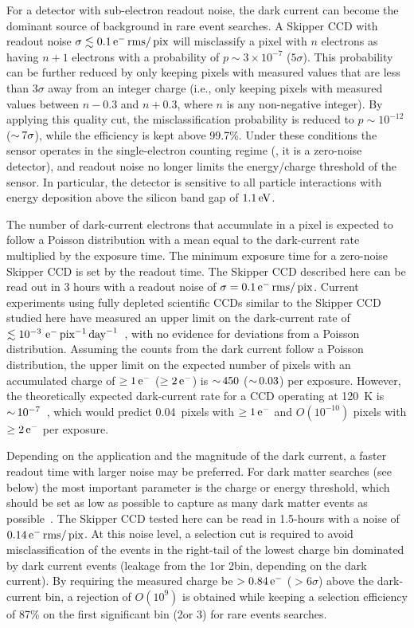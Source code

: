 \documentclass[aps,prl,reprint,superscriptaddress,floatfix,nofootinbib,showkeys,showpacs,preprintnumbers]{revtex4-1}
\begin{document}
For a detector with sub-electron readout noise, the dark current can become the dominant source of background in rare event searches.
A Skipper CCD with readout noise $\sigma \lesssim 0.1 \mathrm{\,e^{-}} \mathrm{\,rms}/\mathrm{\,pix}$ will misclassify a pixel with $n$ electrons as having $n+1$ electrons with a probability of $p\sim3\times10^{-7}$ ($5\sigma$).
This probability can be further reduced by only keeping pixels with measured values that are less than 3$\sigma$ away from an integer charge (i.e., only keeping pixels with measured values between $n-0.3$ and $n + 0.3$, where $n$ is any non-negative integer).
By applying this quality cut, the misclassification probability is reduced to $p\sim10^{-12}$ ($ {\sim}\, 7\sigma$), while the efficiency is kept above 99.7\%.
Under these conditions the sensor operates in the single-electron counting regime (\ie, it is a zero-noise detector), and readout noise no longer limits the energy/charge threshold of the sensor.
In particular, the detector is sensitive to all particle interactions with energy deposition above the silicon band gap of $1.1\mathrm{\,eV}$. 

The number of dark-current electrons that accumulate in a pixel is expected to follow a Poisson distribution with a mean equal to the dark-current rate multiplied by the exposure time.
The minimum exposure time for a zero-noise Skipper CCD is set by the readout time. 
The Skipper CCD described here can be read out in 3 hours with a readout noise of $\sigma = 0.1 \mathrm{\,e^{-}} \mathrm{\,rms}/\mathrm{\,pix}$.
Current experiments using fully depleted scientific CCDs similar to the Skipper CCD studied here have measured an upper limit on the dark-current rate of $\lesssim 10^{-3} \mathrm{\,\mathrm{\,e^{-}} \mathrm{\,pix}^{-1} \mathrm{\,day}^{-1}}$~\cite{Aguilar-Arevalo:2016zop}, with no evidence for deviations from a Poisson distribution.
Assuming the counts from the dark current follow a Poisson distribution, the upper limit on the expected number of pixels with an accumulated charge of $\geq 1\mathrm{\,e^{-}}$ ($\geq 2\mathrm{\,e^{-}}$) is $ {\sim}\, 450$ ($ {\sim}\, 0.03$) per exposure. 
However, the theoretically expected dark-current rate for a CCD operating at 120~K is $ {\sim}\, 10^{-7}$~\cite{Janesick:2001}, which would predict 0.04~pixels with $\geq 1\mathrm{\,e^{-}}$ and $O(10^{-10})$ pixels with $\geq 2\mathrm{\,e^{-}}$ per exposure. 

Depending on the application and the magnitude of the dark current, a faster readout time with larger noise may be preferred.
For dark matter searches (see below) the most important parameter is the charge or energy threshold, which should be set as low as possible to capture as many dark matter events as possible~\cite{Essig:2015cda}. 
The Skipper CCD tested here can be read in 1.5-hours with a noise of $0.14\mathrm{\,e^{-}} \mathrm{\,rms}/\mathrm{\,pix}$. 
At this noise level, a selection cut is required to avoid misclassification of the events in the right-tail of the lowest charge bin dominated by dark current events (leakage from the 1\e or 2\e bin, depending on the dark current). 
By requiring the measured charge be $>0.84\mathrm{\,e^{-}}$ ($> 6\sigma$) above the dark-current bin, a rejection of $O(10^{9})$ is obtained while keeping a selection efficiency of 87\% on the first significant bin (2\e or 3\e) for rare events searches.
\end{document}

